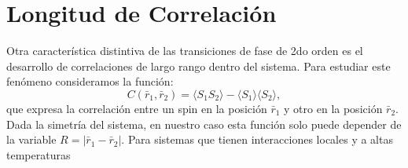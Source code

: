 \documentclass[a4paper,11pt,oneside]{article}
\newcommand{\mean}[1]{\langle #1 \rangle}
\begin{document}
\section{Longitud de Correlación}

Otra característica distintiva de las transiciones de fase de 2do orden es el desarrollo de
correlaciones de largo rango dentro del sistema. Para estudiar este fenómeno
consideramos la función:
\begin{equation}
    C(\bar r_1, \bar r_2) = \mean{S_1 S_2} - \mean{S_1}\mean{S_2},
\end{equation}
que expresa la correlación entre un spin en la posición $\bar r_1$ y otro en la
posición $\bar r_2$.
Dada la simetría del sistema, en nuestro caso
esta función solo puede depender de la variable $R=|\bar r_1 - \bar r_2|$. Para
sistemas que tienen interacciones locales y a altas temperaturas
\end{document}
